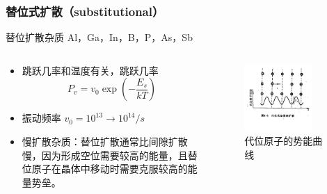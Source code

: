 \documentclass[xcolor=table,dvipsnames,svgnames,aspectratio=169]{ctexbeamer}
\begin{document}
\begin{frame}
  \frametitle{替位式扩散（substitutional）}

  替位扩散杂质 Al，Ga，In，B，P，As，Sb

  \begin{columns}
    \begin{column}{0.7\textwidth}
      \begin{itemize}
        \item 跳跃几率和温度有关，跳跃几率
          \[
            P_v = v_0 \exp(-\frac{E_s}{kT})
          \]
        \item 振动频率 $v_0 = 10^{13} \to 10^{14}/s$
        \item 慢扩散杂质：替位扩散通常比间隙扩散慢，因为形成空位需要较高的能量，且替位原子在晶体中移动时需要克服较高的能量势垒。
      \end{itemize}
    \end{column}
    \begin{column}{0.3\textwidth}
      \begin{figure}
        \centering
        \includegraphics[width=0.8\textwidth]{代位原子的势能曲线.png}
        \caption{代位原子的势能曲线}
      \end{figure}
    \end{column}
  \end{columns}

\end{frame}
\end{document}
